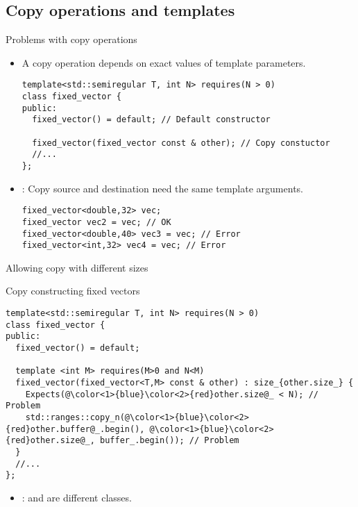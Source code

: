 \subsection{Copy operations and templates}

\begin{frame}[t,fragile]{Problems with copy operations}
\begin{itemize}
  \item A copy operation depends on exact values of template parameters.
\begin{lstlisting}
template<std::semiregular T, int N> requires(N > 0)
class fixed_vector {
public:
  fixed_vector() = default; // Default constructor

  fixed_vector(fixed_vector const & other); // Copy constuctor
  //...
};
\end{lstlisting}

  \item {}: Copy source and destination need 
        the same template arguments.
\begin{lstlisting}
fixed_vector<double,32> vec;
fixed_vector vec2 = vec; // OK
fixed_vector<double,40> vec3 = vec; // Error
fixed_vector<int,32> vec4 = vec; // Error
\end{lstlisting}

\end{itemize}
\end{frame}

\begin{frame}[t,fragile]{Allowing copy with different sizes}
\begin{block}{Copy constructing fixed vectors}
\begin{lstlisting}[escapechar=@]
template<std::semiregular T, int N> requires(N > 0)
class fixed_vector {
public:
  fixed_vector() = default;

  template <int M> requires(M>0 and N<M)
  fixed_vector(fixed_vector<T,M> const & other) : size_{other.size_} {
    Expects(@\color<1>{blue}\color<2>{red}other.size@_ < N); // Problem
    std::ranges::copy_n(@\color<1>{blue}\color<2>{red}other.buffer@_.begin(), @\color<1>{blue}\color<2>{red}other.size@_, buffer_.begin()); // Problem
  }
  //...
};
\end{lstlisting}
\end{block}
\begin{itemize}
  \item<2> :  and  are different classes.
\end{itemize}
\end{frame}

